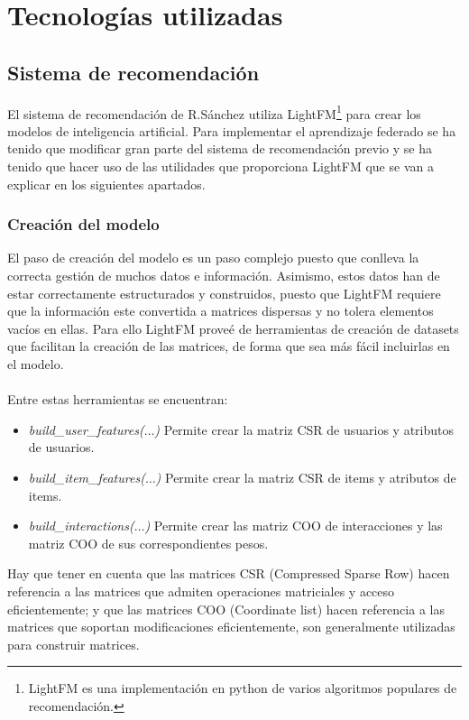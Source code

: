 \section{Tecnologías utilizadas}

\subsection{Sistema de recomendación}
El sistema de recomendación de R.Sánchez utiliza LightFM\footnote{LightFM es una implementación en python de varios algoritmos populares de recomendación.} para crear los modelos de inteligencia artificial. Para implementar el aprendizaje federado se ha tenido que modificar gran parte del sistema de recomendación previo y se ha tenido que hacer uso de las utilidades que proporciona LightFM que se van a explicar en los siguientes apartados. 
\subsubsection{Creación del modelo}
El paso de creación del modelo es un paso complejo puesto que conlleva la correcta gestión de muchos datos e información. Asimismo, estos datos han de estar correctamente estructurados y construidos, puesto que LightFM requiere que la información este convertida a matrices dispersas y no tolera elementos vacíos en ellas. Para ello LightFM proveé de herramientas de creación de datasets que facilitan la creación de las matrices, de forma que sea más fácil incluirlas en el modelo. 
\\ \\
Entre estas herramientas se encuentran:

\begin{itemize}
    \item \textit{build\_user\_features($\ldots$)} \quad Permite crear la matriz CSR de usuarios y atributos de usuarios.
    \item \textit{build\_item\_features($\ldots$)} \quad Permite crear la matriz CSR  de items y atributos de items.
    \item \textit{build\_interactions($\ldots$)} \quad Permite crear las matriz COO de interacciones y las matriz COO de sus correspondientes pesos.
\end{itemize}

Hay que tener en cuenta que las matrices CSR (Compressed Sparse Row) hacen referencia a las matrices que admiten operaciones matriciales y acceso eficientemente; y que las matrices COO (Coordinate list) hacen referencia a las matrices que soportan modificaciones eficientemente, son generalmente utilizadas para construir matrices.


